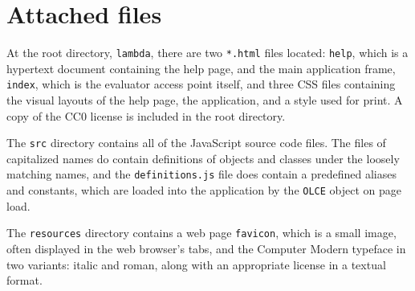 \documentclass[table, a4paper, 10pt]{book}
\begin{document}
\chapter{Attached files}\label{dix:files}
\vspace{1cm}
\begin{multicols}{2}
\noindent
At the root directory, \texttt{lambda}, there are two \texttt{*.html}
files located: \texttt{help}, which is a hypertext document containing the
help page, and the main application frame, \texttt{index}, which is
the evaluator access point itself, and three CSS files containing
the visual layouts of the help page, the application, and a style
used for print. A copy of the CC0 license is included in the root directory.

The \texttt{src} directory contains all of the JavaScript source code files.
The files of capitalized names do contain definitions of objects and classes under
the loosely matching names, and the \texttt{definitions.js} file
does contain a predefined aliases and constants, which are
loaded into the application by the \texttt{OLCE} object on page load.

The \texttt{resources} directory contains a web page \texttt{favicon},
which is a small image, often displayed in the web browser's tabs,
and the Computer Modern typeface in two variants: italic and roman, along with an
appropriate license in a textual format.
\columnbreak
\DTsetlength{0.2em}{1em}{0.2em}{0.7pt}{0cm}
\end{multicols}

\printbibliography
\end{document}
